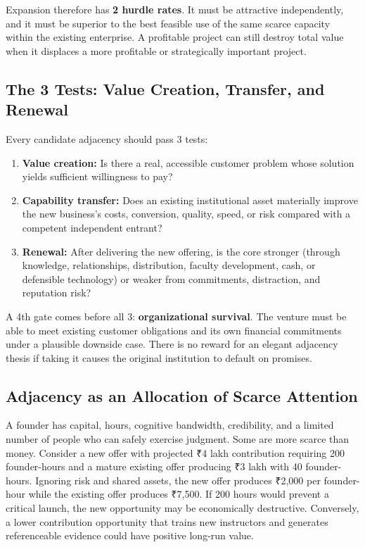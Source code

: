 Expansion therefore has \textbf{2 hurdle rates}. It must be attractive independently, and it must be superior to the best feasible use of the same scarce capacity within the existing enterprise. A profitable project can still destroy total value when it displaces a more profitable or strategically important project.

\subsection{The 3 Tests: Value Creation, Transfer, and Renewal}
\label{sec:three_tests_creation_transfer_renewal}

Every candidate adjacency should pass 3 tests:
\begin{enumerate}
    \item \textbf{Value creation:} Is there a real, accessible customer problem whose solution yields sufficient willingness to pay?
    \item \textbf{Capability transfer:} Does an existing institutional asset materially improve the new business's costs, conversion, quality, speed, or risk compared with a competent independent entrant?
    \item \textbf{Renewal:} After delivering the new offering, is the core stronger (through knowledge, relationships, distribution, faculty development, cash, or defensible technology) or weaker from commitments, distraction, and reputation risk?
\end{enumerate}

A 4th gate comes before all 3: \textbf{organizational survival}. The venture must be able to meet existing customer obligations and its own financial commitments under a plausible downside case. There is no reward for an elegant adjacency thesis if taking it causes the original institution to default on promises.

\subsection{Adjacency as an Allocation of Scarce Attention}
\label{sec:adjacency_allocation_scarce_attention}

A founder has capital, hours, cognitive bandwidth, credibility, and a limited number of people who can safely exercise judgment. Some are more scarce than money. Consider a new offer with projected ₹4 lakh contribution requiring 200 founder-hours and a mature existing offer producing ₹3 lakh with 40 founder-hours. Ignoring risk and shared assets, the new offer produces ₹2,000 per founder-hour while the existing offer produces ₹7,500. If 200 hours would prevent a critical launch, the new opportunity may be economically destructive. Conversely, a lower contribution opportunity that trains new instructors and generates referenceable evidence could have positive long-run value.

